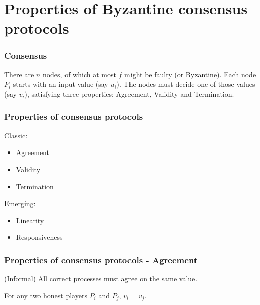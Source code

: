 \documentclass{beamer}
\begin{document}

\section{Properties of Byzantine consensus protocols}


\begin{frame}
\frametitle{Consensus}


\begin{definition}[Consensus]
There are $n$ nodes, of which at most $f$ might be faulty (or Byzantine).
Each node $P_i$ starts with an input value (say $u_i$).
The nodes must decide one of those values (say $v_i$), satisfying three properties: Agreement, Validity and Termination.
\end{definition}

\end{frame}

\begin{frame}
    \frametitle{Properties of consensus protocols}

    Classic:

    \begin{itemize}
        \item Agreement
        \item Validity
        \item Termination
    \end{itemize}

    Emerging:

    \begin{itemize}
        \item Linearity
        \item Responsiveness
    \end{itemize}

\end{frame}

\begin{frame}
\frametitle{Properties of consensus protocols - Agreement}

(Informal) All correct processes must agree on the same value.

\begin{definition}[Agreement]
For any two honest players $P_i$ and $P_j$, $v_i = v_j$.
\end{definition}

\end{frame}
\end{document}

